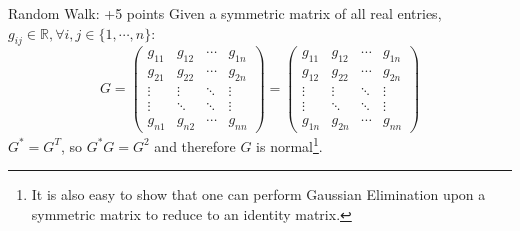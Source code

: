 \documentclass[12pt]{article}
\makeatletter
\newcommand{\<}{\langle}
\renewcommand{\>}{\rangle}
\newenvironment{problem}{\@startsection
       {section}
       {1}
       {-.2em}
       {-3.5ex plus -1ex minus -.2ex}
       {2.3ex plus .2ex}
       {\pagebreak[3]
       \large\bf\noindent{Problem }
       }
       }
       {%
       \begin{center}\large\bf \end{center}}
\def\RR{\mathbb{R}}
\makeatother
\begin{document}
\newpage
\begin{problem}{Random Walk: +5 points}
Given a symmetric matrix of all real entries, $g_{ij}\in\RR, \forall i,j \in \{1, \cdots, n\}$:
$$G = \left( \begin{array}{cccccc}
g_{11} & g_{12} & \cdots & g_{1n}\\
g_{21} & g_{22} & \cdots & g_{2n}\\
\vdots & \vdots & \ddots & \vdots\\
\vdots & \ddots & \ddots & \vdots\\
g_{n1} & g_{n2} & \cdots & g_{nn}
\end{array} \right) = 
\left( \begin{array}{cccccc}
g_{11} & g_{12} & \cdots & g_{1n}\\
g_{12} & g_{22} & \cdots & g_{2n}\\
\vdots & \vdots & \ddots & \vdots\\
\vdots & \ddots & \ddots & \vdots\\
g_{1n} & g_{2n} & \cdots & g_{nn}
\end{array} \right)$$
$G^* = G^T$, so $G^*G = G^2$ and therefore $G$ is normal\footnote{It is also easy to show that one can perform Gaussian Elimination upon a symmetric matrix to reduce to an identity matrix.}.
\end{problem}
\end{document}
